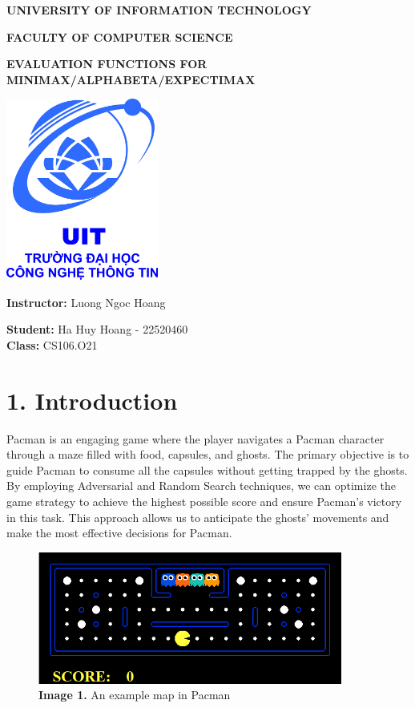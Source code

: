 \documentclass[english, a4paper,12pt]{article}
\date{}
\begin{document}
\begin{titlepage}
\begin{center}
\textbf{UNIVERSITY OF INFORMATION TECHNOLOGY}

\textbf{FACULTY OF COMPUTER SCIENCE}

\vspace{1cm}

\vspace{1cm}

\textbf{EVALUATION FUNCTIONS FOR MINIMAX/ALPHABETA/EXPECTIMAX}

\vspace{2cm}
\includegraphics[width= 5cm]{logo.png}
\vspace{2cm}

\textbf{Instructor: } Luong Ngoc Hoang

\vspace{0.5cm}

\textbf{Student:} Ha Huy Hoang - 22520460
\vspace{0.5cm}
\\
\textbf{Class:} CS106.O21
\vspace{2cm}
\tableofcontents
\end{center}
\end{titlepage}

\section*{1. Introduction}
\hspace*{7mm}Pacman is an engaging game where the player navigates a Pacman character through a maze filled with food, capsules, and ghosts. The primary objective is to guide Pacman to consume all the capsules without getting trapped by the ghosts. By employing Adversarial and Random Search techniques, we can optimize the game strategy to achieve the highest possible score and ensure Pacman’s victory in this task. This approach allows us to anticipate the ghosts’ movements and make the most effective decisions for Pacman.
\begin{figure}[h]
\centering
\includegraphics[width=10cm]{image.png}
\caption*{\textbf{Image 1.} An example map in Pacman}
\end{figure}
\end{document}
